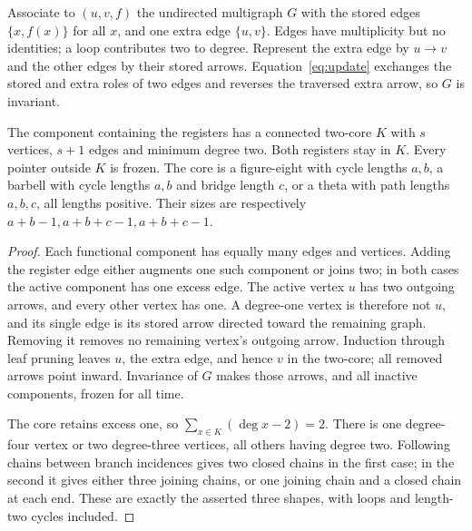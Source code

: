 Associate to $(u,v,f)$ the undirected multigraph $G$ with the stored edges
$\{x,f(x)\}$ for all $x$, and one extra edge $\{u,v\}$. Edges have
multiplicity but no identities; a loop contributes two to degree. Represent
the extra edge by $u\to v$ and the other edges by their stored arrows.
Equation~\eqref{eq:update} exchanges the stored and extra roles of two
edges and reverses the traversed extra arrow, so $G$ is invariant.

\begin{lemma}\label{lem:core}
The component containing the registers has a connected two-core $K$ with
$s$ vertices, $s+1$ edges and minimum degree two. Both registers stay in
$K$. Every pointer outside $K$ is frozen. The core is a figure-eight with
cycle lengths $a,b$, a barbell with cycle lengths $a,b$ and bridge length
$c$, or a theta with path lengths $a,b,c$, all lengths positive.
Their sizes are respectively $a+b-1,a+b+c-1,a+b+c-1$.
\end{lemma}
\begin{proof}
Each functional component has equally many edges and vertices. Adding the
register edge either augments one such component or joins two; in both
cases the active component has one excess edge. The active vertex $u$ has
two outgoing arrows, and every other vertex has one. A degree-one vertex
is therefore not $u$, and its single edge is its stored arrow directed
toward the remaining graph. Removing it removes no remaining vertex's
outgoing arrow. Induction through leaf pruning leaves $u$, the extra edge,
and hence $v$ in the two-core; all removed arrows point inward. Invariance
of $G$ makes those arrows, and all inactive components, frozen for all time.

The core retains excess one, so $\sum_{x\in K}(\deg x-2)=2$.
There is one degree-four vertex or two degree-three vertices, all others
having degree two. Following chains between branch incidences gives two
closed chains in the first case; in the second it gives either three
joining chains, or one joining chain and a closed chain at each end.
These are exactly the asserted three shapes, with loops and length-two
cycles included.
\end{proof}
